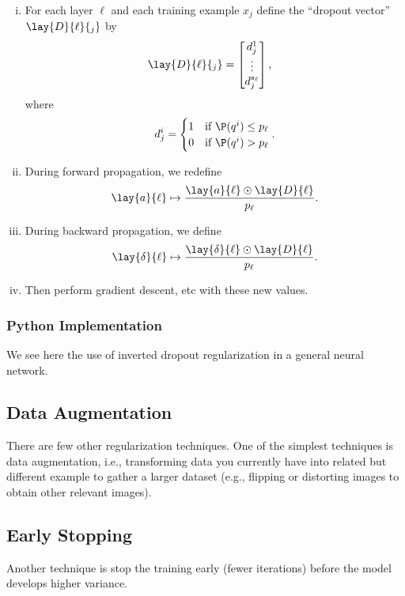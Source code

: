 \begin{enumerate}[i.]
	\item For each layer $\ell$ and each training example $x_j$ define the ``dropout vector'' $\lay{D}{\ell}{_j}$ by
	\begin{align*}
		\lay{D}{\ell}{_j}&=\begin{bmatrix}
			d^1_j\\
			\vdots\\
			d^{s_\ell}_j
		\end{bmatrix},
	\end{align*}
	where
	$$d^i_j=\begin{cases}
		1&\text{if }\P(q^i)\leq p_\ell\\
		0&\text{if }\P(q^i)>p_\ell
	\end{cases}.$$
	\item During forward propagation, we redefine
	$$\lay{a}{\ell}\mapsto \frac{\lay{a}{\ell}\odot \lay{D}{\ell}}{p_\ell}.$$
	\item During backward propagation, we define
	$$\lay{\delta}{\ell}\mapsto \frac{\lay{\delta}{\ell}\odot\lay{D}{\ell}}{p_\ell}.$$
	\item Then perform gradient descent, etc with these new values.
\end{enumerate}

\subsubsection{Python Implementation}
We see here the use of inverted dropout regularization in a general neural network.





\subsection{Data Augmentation}

There are few other regularization techniques.  One of the simplest techniques is data augmentation, i.e., transforming data you currently have into related but different example to gather a larger dataset (e.g., flipping or distorting images to obtain other relevant images).

\subsection{Early Stopping}
Another technique is stop the training early (fewer iterations) before the model develops higher variance.

